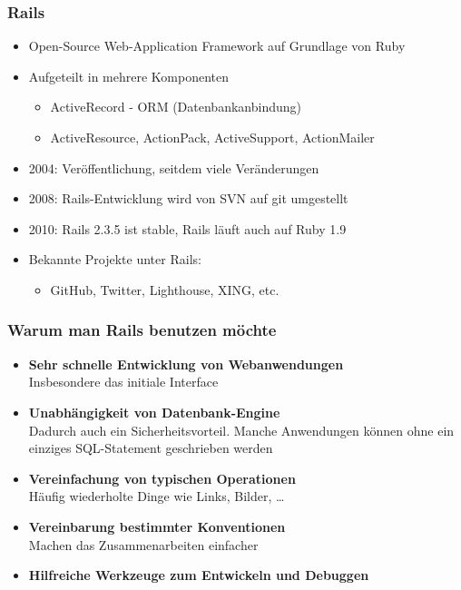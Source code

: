 \begin{frame}
  \frametitle{Rails}
  \begin{itemize}
    \item{Open-Source Web-Application Framework auf Grundlage von Ruby}
    \item{Aufgeteilt in mehrere Komponenten}
    \begin{itemize}
      \item{ActiveRecord - ORM (Datenbankanbindung)}
      \item{ActiveResource, ActionPack, ActiveSupport, ActionMailer}
    \end{itemize}
    \vspace{0.3cm}

    \item{2004: Veröffentlichung, seitdem viele Veränderungen}
    \item{2008: Rails-Entwicklung wird von SVN auf git umgestellt}
    \item{2010: Rails 2.3.5 ist stable, Rails läuft auch auf Ruby 1.9}
    \vspace{0.3cm}

    \item{Bekannte Projekte unter Rails:}
    \begin{itemize}
      \item{GitHub, Twitter, Lighthouse, XING, etc.}
    \end{itemize}
  \end{itemize}
\end{frame}

\begin{frame}
  \frametitle{Warum man Rails benutzen möchte}
  \begin{itemize}
    \pause
    \item{{\bf Sehr schnelle Entwicklung von Webanwendungen} \\ Insbesondere das initiale Interface}
    \pause
    \item{{\bf Unabhängigkeit von Datenbank-Engine} \\ Dadurch auch ein Sicherheitsvorteil. Manche Anwendungen können ohne ein einziges SQL-Statement geschrieben werden}
    \pause
    \item{{\bf Vereinfachung von typischen Operationen} \\ Häufig wiederholte Dinge wie Links, Bilder, \ldots}
    \pause
    \item{{\bf Vereinbarung bestimmter Konventionen} \\ Machen das Zusammenarbeiten einfacher}
    \pause
    \item{{\bf Hilfreiche Werkzeuge zum Entwickeln und Debuggen}}
  \end{itemize}
\end{frame}

